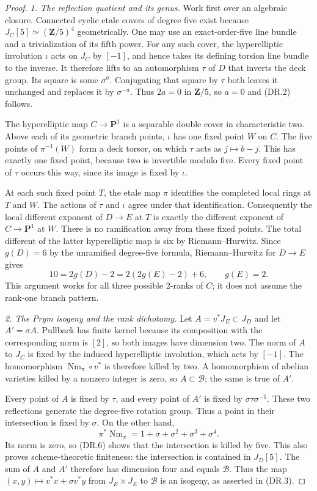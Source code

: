 \begin{proof}
\emph{1. The reflection quotient and its genus.}
Work first over an algebraic closure.  Connected cyclic etale covers of
degree five exist because $J_C[5]\simeq(\mathbf Z/5)^4$ geometrically.
One may use an exact-order-five line bundle and a trivialization of its
fifth power.  For any such cover, the hyperelliptic involution $\iota$
acts on $J_C$ by $[-1]$, and hence takes its defining torsion line
bundle to the inverse.  It therefore lifts to an automorphism $\tau$
of $D$ that inverts the deck group.  Its square is some $\sigma^a$.
Conjugating that square by $\tau$ both leaves it unchanged and replaces
it by $\sigma^{-a}$.  Thus $2a=0$ in $\mathbf Z/5$, so $a=0$ and
(DR.2) follows.

The hyperelliptic map $C\to\mathbf P^1$ is a separable double cover in
characteristic two.  Above each of its geometric branch points,
$\iota$ has one fixed point $W$ on $C$.  The five points of
$\pi^{-1}(W)$ form a deck torsor, on which $\tau$ acts as
$j\mapsto b-j$.  This has exactly one fixed point, because two is
invertible modulo five.  Every fixed point of $\tau$ occurs this way,
since its image is fixed by $\iota$.

At each such fixed point $T$, the etale map $\pi$ identifies the
completed local rings at $T$ and $W$.  The actions of $\tau$ and
$\iota$ agree under that identification.  Consequently the local
different exponent of $D\to E$ at $T$ is exactly the different
exponent of $C\to\mathbf P^1$ at $W$.  There is no ramification away
from these fixed points.  The total different of the latter
hyperelliptic map is six by Riemann--Hurwitz.  Since $g(D)=6$ by the
unramified degree-five formula, Riemann--Hurwitz for $D\to E$ gives
\[
                 10=2g(D)-2=2(2g(E)-2)+6,
                 \qquad g(E)=2.
 \tag{DR.5}
\]
This argument works for all three possible $2$-ranks of $C$; it does
not assume the rank-one branch pattern.

\emph{2. The Prym isogeny and the rank dichotomy.}
Let $A=v^*J_E\subset J_D$ and let $A'=\sigma A$.  Pullback has
finite kernel because its composition with the corresponding norm is
$[2]$, so both images have dimension two.  The norm of $A$ to $J_C$
is fixed by the induced hyperelliptic involution, which acts by $[-1]$.
The homomorphism $\operatorname{Nm}_\pi\circ v^*$ is therefore killed
by two.  A homomorphism of abelian varieties killed by a nonzero integer
is zero, so $A\subset\mathcal B$; the same is true of $A'$.

Every point of $A$ is fixed by $\tau$, and every point of $A'$ is fixed
by $\sigma\tau\sigma^{-1}$.  These two reflections generate the
degree-five rotation group.  Thus a point in their intersection is
fixed by $\sigma$.  On the other hand,
\[
 \pi^*\operatorname{Nm}_\pi=1+\sigma+\sigma^2+\sigma^3+\sigma^4.
 \tag{DR.6}
\]
Its norm is zero, so (DR.6) shows that the intersection is killed by
five.  This also proves scheme-theoretic finiteness: the intersection
is contained in $J_D[5]$.  The sum of $A$ and $A'$ therefore has
dimension four and equals $\mathcal B$.  Thus the map
$(x,y)\mapsto v^*x+\sigma v^*y$ from $J_E\times J_E$ to
$\mathcal B$ is an isogeny, as asserted in (DR.3).


\end{proof}
